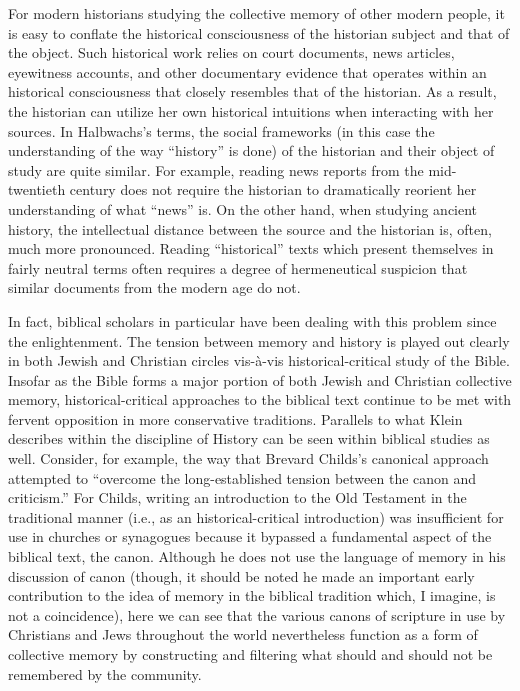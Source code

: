 For modern historians studying the collective memory of other modern
people, it is easy to conflate the historical consciousness of the
historian subject and that of the object. Such historical work relies on
court documents, news articles, eyewitness accounts, and other
documentary evidence that operates within an historical consciousness
that closely resembles that of the historian. As a result, the historian
can utilize her own historical intuitions when interacting with her
sources. In Halbwachs's terms, the social frameworks (in this case the
understanding of the way ``history'' is done) of the historian and their
object of study are quite similar. For example, reading news reports
from the mid-twentieth century does not require the historian to
dramatically reorient her understanding of what ``news'' is. On the
other hand, when studying ancient history, the intellectual distance
between the source and the historian is, often, much more pronounced.
Reading ``historical'' texts which present themselves in fairly neutral
terms often requires a degree of hermeneutical suspicion that similar
documents from the modern age do not.

In fact, biblical scholars in particular have been dealing with this
problem since the enlightenment. The tension between memory and history
is played out clearly in both Jewish and Christian circles vis-à-vis
historical-critical study of the Bible. Insofar as the Bible forms a
major portion of both Jewish and Christian collective memory,
historical-critical approaches to the biblical text continue to be met
with fervent opposition in more conservative traditions. Parallels to
what Klein describes within the discipline of History can be seen within
biblical studies as well. Consider, for example, the way that Brevard
Childs's canonical approach attempted to ``overcome the long-established
tension between the canon and criticism.''\autocite[45]{childs1979} For
Childs, writing an introduction to the Old Testament in the traditional
manner (i.e., as an historical-critical introduction) was insufficient
for use in churches or synagogues because it bypassed a fundamental
aspect of the biblical text, the canon. Although he does not use the
language of memory in his discussion of canon (though, it should be
noted he made an important early contribution to the idea of memory in
the biblical tradition which, I imagine, is not a
coincidence\autocite{childs1962}), here we can see that the various
canons of scripture in use by Christians and Jews throughout the world
nevertheless function as a form of collective memory by constructing and
filtering what should and should not be remembered by the community.

